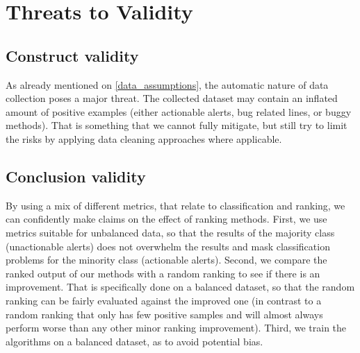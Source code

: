 
\section{Threats to Validity}\label{sec:threats}

\subsection{Construct validity}

As already mentioned on \cref{data_assumptions}, the automatic nature of data collection poses a major threat. The collected dataset may contain an inflated amount of positive examples (either actionable alerts, bug related lines, or buggy methods). That is something that we cannot fully mitigate, but still try to limit the risks by applying data cleaning approaches where applicable.

\subsection{Conclusion validity}

By using a mix of different metrics, that relate to classification and ranking, we can confidently make claims on the effect of ranking methods. 
First, we use metrics suitable for unbalanced data, so that the results of the majority class (unactionable alerts) does not overwhelm the results and mask classification problems for the minority class (actionable alerts). Second, we compare the ranked output of our methods with a random ranking to see if there is an improvement. That is specifically done on a balanced dataset, so that the random ranking can be fairly evaluated against the improved one (in contrast to a random ranking that only has few positive samples and will almost always perform worse than any other minor ranking improvement). Third, we train the algorithms on a balanced dataset, as to avoid potential bias.


